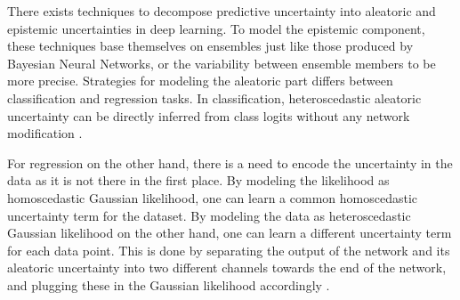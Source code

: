 There exists techniques to decompose predictive uncertainty into aleatoric and epistemic uncertainties in deep learning. To model the epistemic component, these techniques base themselves on ensembles just like those produced by Bayesian Neural Networks, or the variability between ensemble members to be more precise. Strategies for modeling the aleatoric part differs between classification and regression tasks. In classification, heteroscedastic aleatoric uncertainty can be directly inferred from class logits without any network modification \cite{shridhar_comprehensive_2019, kwon_uncertainty_2020}.

For regression on the other hand, there is a need to encode the uncertainty in the data as it is not there in the first place. By modeling the likelihood as homoscedastic Gaussian likelihood, one can learn a common homoscedastic uncertainty term for the dataset. By modeling the data as heteroscedastic Gaussian likelihood on the other hand, one can learn a different uncertainty term for each data point. This is done by separating the output of the network and its aleatoric uncertainty into two different channels towards the end of the network, and plugging these in the Gaussian likelihood accordingly \cite{kendall_what_2017}.





